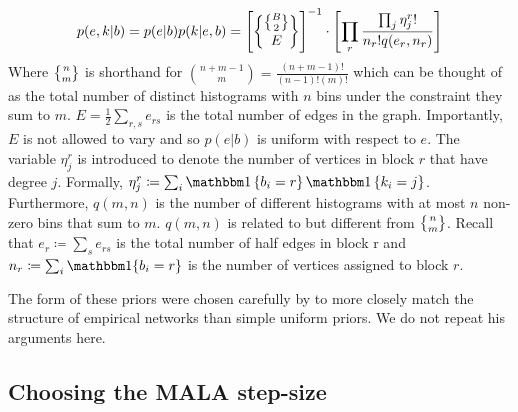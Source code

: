 %
\begin{equation}
	p(e, k | b) = p(e | b) p(k| e, b) = \left[ \specialchoose{ \specialchoose{B}{2} }{ E} \right]^{-1} 
	\cdot \left[ \prod_r \frac{\prod_j \eta_j^r !}{n_r! q(e_r, n_r)} \right]
\end{equation}
%
Where $\specialchoose{n}{m}$ is shorthand for $\binom{n+m-1}{m} = \frac{(n+m-1)!}{(n-1)!(m)!}$ which can be thought of as the total number of distinct histograms with $n$ bins under the constraint they sum to $m$. $E = \frac{1}{2} \sum_{r,s} e_{rs}$ is the total number of edges in the graph. Importantly, $E$ is not allowed to vary and so $p(e|b)$ is uniform with respect to $e$. The variable $\eta_j^r$ is introduced to denote the number of vertices in block $r$ that have degree $j$. Formally, $\eta_j^r \coloneqq \sum_{i} \one\left\{b_i = r \right\} \one \left\{k_i = j \right\}$. Furthermore, $q(m, n)$ is the number of different histograms with at most $n$ non-zero bins that sum to $m$. $q(m, n)$ is related to but different from $\specialchoose{n}{m}$. Recall that $e_r \coloneqq \sum_{s} e_{rs}$ is the total number of half edges in block r and $n_r \coloneqq \sum_{i} \one\{b_i = r\}$ is the number of vertices assigned to block $r$. 

The form of these priors were chosen carefully by \citet{Peixoto-Bayesian-Microcanonical} to more closely match the structure of empirical networks than simple uniform priors. We do not repeat his arguments here.

\subsection{Choosing the MALA step-size}
\label{appdx:step-size}

